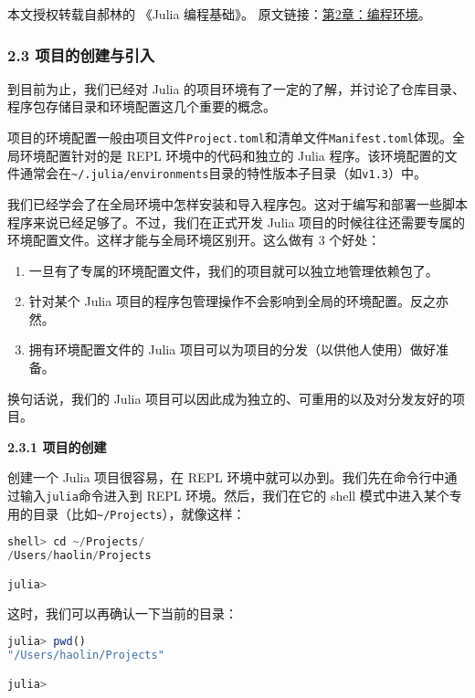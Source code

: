 
本文授权转载自郝林的 《Julia 编程基础》。 原文链接：\href{https://github.com/hyper0x/JuliaBasics/blob/master/book/ch02.md}{第2章：编程环境}。


\subsubsection{2.3 项目的创建与引入}

到目前为止，我们已经对 Julia 的项目环境有了一定的了解，并讨论了仓库目录、程序包存储目录和环境配置这几个重要的概念。

项目的环境配置一般由项目文件\verb|Project.toml|和清单文件\verb|Manifest.toml|体现。全局环境配置针对的是 REPL 环境中的代码和独立的 Julia 程序。该环境配置的文件通常会在\verb|~/.julia/environments|目录的特性版本子目录（如\verb|v1.3|）中。

我们已经学会了在全局环境中怎样安装和导入程序包。这对于编写和部署一些脚本程序来说已经足够了。不过，我们在正式开发 Julia 项目的时候往往还需要专属的环境配置文件。这样才能与全局环境区别开。这么做有 3 个好处：

\begin{enumerate}
\item 一旦有了专属的环境配置文件，我们的项目就可以独立地管理依赖包了。
\item 针对某个 Julia 项目的程序包管理操作不会影响到全局的环境配置。反之亦然。
\item 拥有环境配置文件的 Julia 项目可以为项目的分发（以供他人使用）做好准备。
\end{enumerate}

换句话说，我们的 Julia 项目可以因此成为独立的、可重用的以及对分发友好的项目。

\textbf{2.3.1 项目的创建}

创建一个 Julia 项目很容易，在 REPL 环境中就可以办到。我们先在命令行中通过输入\verb|julia|命令进入到 REPL 环境。然后，我们在它的 shell 模式中进入某个专用的目录（比如\verb|~/Projects|），就像这样：

\begin{lstlisting}[language=julia]
shell> cd ~/Projects/
/Users/haolin/Projects

julia> 
\end{lstlisting}

这时，我们可以再确认一下当前的目录：

\begin{lstlisting}[language=julia]
julia> pwd()
"/Users/haolin/Projects"

julia> 
\end{lstlisting}

